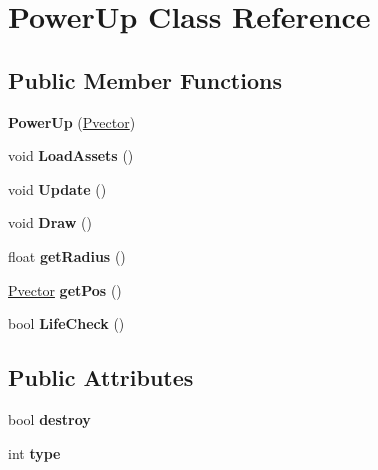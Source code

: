 \hypertarget{class_power_up}{}\section{Power\+Up Class Reference}
\label{class_power_up}
\subsection*{Public Member Functions}
\begin{DoxyCompactItemize}
\item 
{\bfseries Power\+Up} (\hyperlink{class_pvector}{Pvector})\hypertarget{class_power_up_af38b1e387f6bd10001cbb9dad03d5a2c}{}\label{class_power_up_af38b1e387f6bd10001cbb9dad03d5a2c}

\item 
void {\bfseries Load\+Assets} ()\hypertarget{class_power_up_ad200500260ae9a881e2983e175459bb2}{}\label{class_power_up_ad200500260ae9a881e2983e175459bb2}

\item 
void {\bfseries Update} ()\hypertarget{class_power_up_a5a6d4dabd56f482ae37945b84f34ce14}{}\label{class_power_up_a5a6d4dabd56f482ae37945b84f34ce14}

\item 
void {\bfseries Draw} ()\hypertarget{class_power_up_af807bbd0f37c97bd9911ea462dce4d4f}{}\label{class_power_up_af807bbd0f37c97bd9911ea462dce4d4f}

\item 
float {\bfseries get\+Radius} ()\hypertarget{class_power_up_a3c1ca976f9d57d4bc77defe7e4a17cc1}{}\label{class_power_up_a3c1ca976f9d57d4bc77defe7e4a17cc1}

\item 
\hyperlink{class_pvector}{Pvector} {\bfseries get\+Pos} ()\hypertarget{class_power_up_a73bfd1ba5ac2ef39d4240899d4066f40}{}\label{class_power_up_a73bfd1ba5ac2ef39d4240899d4066f40}

\item 
bool {\bfseries Life\+Check} ()\hypertarget{class_power_up_ae6651be80f8585aeada826168572168a}{}\label{class_power_up_ae6651be80f8585aeada826168572168a}

\end{DoxyCompactItemize}
\subsection*{Public Attributes}
\begin{DoxyCompactItemize}
\item 
bool {\bfseries destroy}\hypertarget{class_power_up_a6ee0aea69eabf376f930a3180741473e}{}\label{class_power_up_a6ee0aea69eabf376f930a3180741473e}

\item 
int {\bfseries type}\hypertarget{class_power_up_a5544317590f7aa3c738ff0bcfb85599b}{}\label{class_power_up_a5544317590f7aa3c738ff0bcfb85599b}

\end{DoxyCompactItemize}
